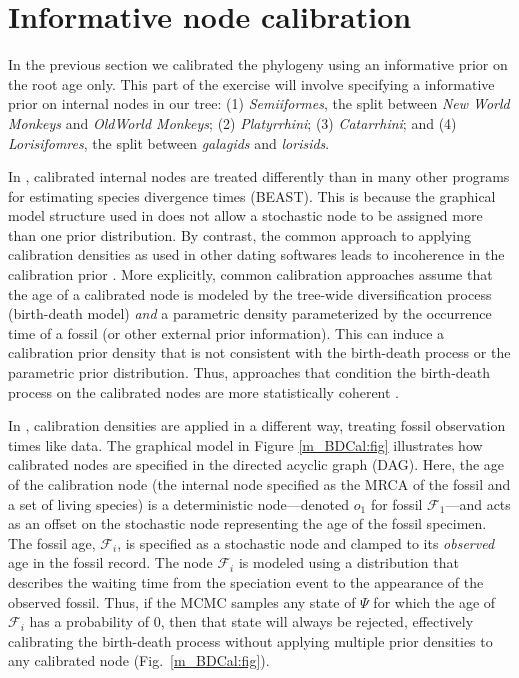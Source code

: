 \newpage
\section{Informative node calibration}\label{sec:NodeCalibration}

In the previous section we calibrated the phylogeny using an informative prior on the root age only.
This part of the exercise will involve specifying a informative prior on internal nodes in our tree: 
(1) \emph{Semiiformes}, the split between \emph{New World Monkeys} and \emph{OldWorld Monkeys}; 
(2) \emph{Platyrrhini};
(3) \emph{Catarrhini}; and 
(4) \emph{Lorisifomres}, the split between \emph{galagids} and \emph{lorisids}.

In \RevBayes, calibrated internal nodes are treated differently than in many other programs for estimating species divergence times (\EG BEAST).
This is because the graphical model structure used in \RevBayes does not allow a stochastic node to be assigned more than one prior distribution. 
By contrast, the common approach to applying calibration densities as used in other dating softwares leads to incoherence in the calibration prior \citep[for detailed explainations of this see][]{Warnock2012,Heled2012,Heath2014}. 
More explicitly, common calibration approaches assume that the age of a calibrated node is modeled by the tree-wide diversification process (\EG birth-death model) \emph{and} a parametric density parameterized by the occurrence time of a fossil (or other external prior information).
This can induce a calibration prior density that is not consistent with the birth-death process or the parametric prior distribution. 
Thus, approaches that condition the birth-death process on the calibrated nodes are more statistically coherent \citep{Yang2006}.

In \RevBayes, calibration densities are applied in a different way, treating fossil observation times like data. 
The graphical model in Figure \ref{m_BDCal:fig} illustrates how calibrated nodes are specified in the directed acyclic graph (DAG).
Here, the age of the calibration node (\IE the internal node specified as the MRCA of the fossil and a set of living species) is a deterministic node---\EG denoted $o_1$ for fossil $\mathcal{F}_1$---and acts as an offset on the stochastic node representing the age of the fossil specimen.
The fossil age, $\mathcal{F}_i$, is specified as a stochastic node and clamped to its \emph{observed} age in the fossil record. 
The node $\mathcal{F}_i$ is modeled using a distribution that describes the waiting time from the speciation event to the appearance of the observed fossil. 
Thus, if the MCMC samples any state of $\Psi$ for which the age of $\mathcal{F}_i$ has a probability of 0, then that state will always be rejected, effectively calibrating the birth-death process without applying multiple prior densities to any calibrated node (Fig.~\ref{m_BDCal:fig}).


